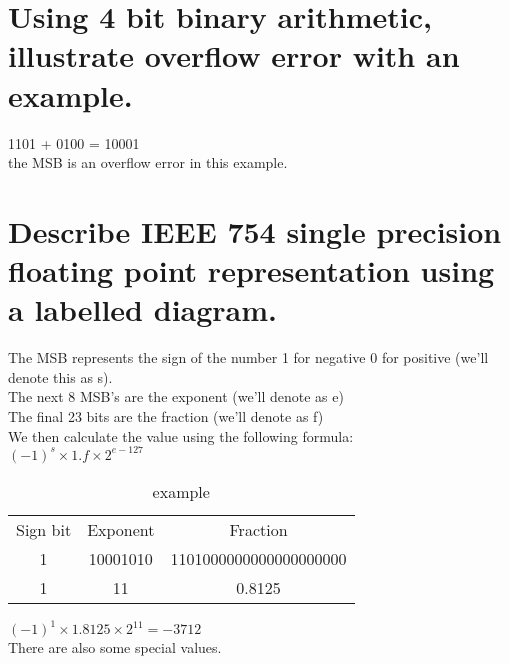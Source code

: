 \documentclass{article}
\begin{document}
\section{Using 4 bit binary arithmetic, illustrate overflow error with an example. }
1101 + 0100 = 10001\\
the MSB is an overflow error in this example.
\newpage
\section{Describe IEEE 754 single precision floating point representation using a labelled diagram.}
The MSB represents the sign of the number 1 for negative 0 for positive (we'll
denote this as s).\\
The next 8 MSB's are the exponent (we'll denote as e)\\
The final 23 bits are the fraction (we'll denote as f)\\
We then calculate the value using the following formula:\\
$(-1)^s \times 1.f \times 2^{e - 127}$\\
\begin{table}[h]
    \centering
    \begin{tabular}{|c|c|c|}
        Sign bit & Exponent & Fraction \\
        1 & 10001010 & 1101000000000000000000\\
        \hline
        1 & 11 & 0.8125
    \end{tabular}
    \caption{example}
    \label{tab:my_label}
\end{table}

$(-1)^1 \times 1.8125 \times 2^{11} = -3712$\\
There are also some special values.
\end{document}

